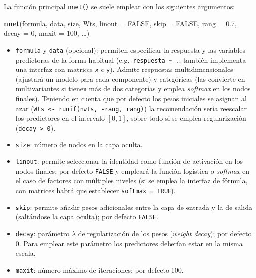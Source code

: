 \documentclass[
  spanish,
]{book}
\newenvironment{Shaded}{\begin{snugshade}}{\end{snugshade}}
\newcommand{\DataTypeTok}[1]{\textcolor[rgb]{0.13,0.29,0.53}{#1}}
\newcommand{\DecValTok}[1]{\textcolor[rgb]{0.00,0.00,0.81}{#1}}
\newcommand{\FloatTok}[1]{\textcolor[rgb]{0.00,0.00,0.81}{#1}}
\newcommand{\KeywordTok}[1]{\textcolor[rgb]{0.13,0.29,0.53}{\textbf{#1}}}
\newcommand{\NormalTok}[1]{#1}
\newcommand{\OtherTok}[1]{\textcolor[rgb]{0.56,0.35,0.01}{#1}}
\theoremstyle{break}
\theoremstyle{definition}
\theoremstyle{definition}
\theoremstyle{definition}
\theoremstyle{remark}
\begin{document}
La función principal \texttt{nnet()} se suele emplear con los siguientes argumentos:

\begin{Shaded}
\begin{Highlighting}[]
\KeywordTok{nnet}\NormalTok{(formula, data, size, Wts, }\DataTypeTok{linout =} \OtherTok{FALSE}\NormalTok{, }\DataTypeTok{skip =} \OtherTok{FALSE}\NormalTok{, }
     \DataTypeTok{rang =} \FloatTok{0.7}\NormalTok{, }\DataTypeTok{decay =} \DecValTok{0}\NormalTok{, }\DataTypeTok{maxit =} \DecValTok{100}\NormalTok{, ...)}
\end{Highlighting}
\end{Shaded}

\begin{itemize}
\item
  \texttt{formula} y \texttt{data} (opcional): permiten especificar la respuesta y las variables predictoras de la forma habitual (e.g.~\texttt{respuesta\ \textasciitilde{}\ .}; también implementa una interfaz con matrices \texttt{x} e \texttt{y}). Admite respuestas multidimensionales (ajustará un modelo para cada componente) y categóricas (las convierte en multivariantes si tienen más de dos categorías y emplea \emph{softmax} en los nodos finales).
  Teniendo en cuenta que por defecto los pesos iniciales se asignan al azar (\texttt{Wts\ \textless{}-\ runif(nwts,\ -rang,\ rang)}) la recomendación sería reescalar los predictores en el intervalo \([0, 1]\), sobre todo si se emplea regularización (\texttt{decay\ \textgreater{}\ 0}).
\item
  \texttt{size}: número de nodos en la capa oculta.
\item
  \texttt{linout}: permite seleccionar la identidad como función de activación en los nodos finales; por defecto \texttt{FALSE} y empleará la función logística o \emph{softmax} en el caso de factores con múltiples niveles (si se emplea la interfaz de fórmula, con matrices habrá que establecer \texttt{softmax\ =\ TRUE}).
\item
  \texttt{skip}: permite añadir pesos adicionales entre la capa de entrada y la de salida (saltándose la capa oculta); por defecto \texttt{FALSE}.
\item
  \texttt{decay}: parámetro \(\lambda\) de regularización de los pesos (\emph{weight decay}); por defecto 0. Para emplear este parámetro los predictores deberían estar en la misma escala.
\item
  \texttt{maxit}: número máximo de iteraciones; por defecto 100.
\end{itemize}
\end{document}
